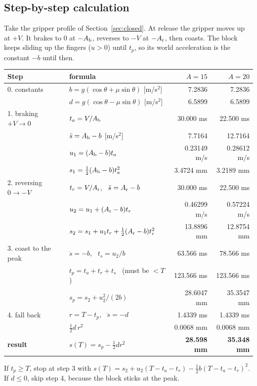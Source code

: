 \subsection*{Step-by-step calculation}
Take the gripper profile of Section~\ref{sec:closed}. At release the gripper moves up at $+V$. It brakes to 0 at
$-A_{\rm b}$, reverses to $-V$ at $-A_{\rm r}$, then coasts. The block keeps sliding up the fingers ($u>0$) until
$t_p$, so its world acceleration is the constant $-b$ until then.
\begin{center}
\small
\renewcommand{\arraystretch}{1.25}
\begin{tabular}{p{3.2cm}p{6.1cm}rr}
\toprule
Step & formula & $A=15$ & $A=20$\\
\midrule
0. constants & $b=g(\cos\theta+\mu\sin\theta)$ [m/s$^2$] & 7.2836 & 7.2836\\
 & $d=g(\cos\theta-\mu\sin\theta)$ [m/s$^2$] & 6.5899 & 6.5899\\
1. braking $+V\to0$ & $t_a=V/A_{\rm b}$ & 30.000 ms & 22.500 ms\\
 & $\ddot s=A_{\rm b}-b$ [m/s$^2$] & 7.7164 & 12.7164\\
 & $u_1=(A_{\rm b}-b)t_a$ & 0.23149 m/s & 0.28612 m/s\\
 & $s_1=\tfrac12(A_{\rm b}-b)t_a^2$ & 3.4724 mm & 3.2189 mm\\
2. reversing $0\to-V$ & $t_r=V/A_{\rm r}$, \ $\ddot s=A_{\rm r}-b$ & 30.000 ms & 22.500 ms\\
 & $u_2=u_1+(A_{\rm r}-b)t_r$ & 0.46299 m/s & 0.57224 m/s\\
 & $s_2=s_1+u_1t_r+\tfrac12(A_{\rm r}-b)t_r^2$ & 13.8896 mm & 12.8754 mm\\
3. coast to the peak & $\ddot s=-b$, \ $t_s=u_2/b$ & 63.566 ms & 78.566 ms\\
 & $t_p=t_a+t_r+t_s$ \ (must be $<T$) & 123.566 ms & 123.566 ms\\
 & $s_p=s_2+u_2^2/(2b)$ & 28.6047 mm & 35.3547 mm\\
4. fall back & $r=T-t_p$, \ $\ddot s=-d$ & 1.4339 ms & 1.4339 ms\\
 & $\tfrac12 d\,r^2$ & 0.0068 mm & 0.0068 mm\\
\midrule
\textbf{result} & $s(T)=s_p-\tfrac12 d r^2$ & \textbf{28.598 mm} & \textbf{35.348 mm}\\
\bottomrule
\end{tabular}
\end{center}
If $t_p\ge T$, stop at step 3 with $s(T)=s_2+u_2(T-t_a-t_r)-\tfrac12 b(T-t_a-t_r)^2$. If $d\le0$, skip step 4,
because the block sticks at the peak.

